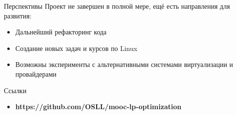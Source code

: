 \documentclass{beamer}
\begin{document}
\begin{frame}{Перспективы}
	Проект не завершен в полной мере, ещё есть направления для развития:
	\begin{itemize}
		\item Дальнейший рефакторинг кода  
		\item Создание новых задач и курсов по Linux
		\item Возможны эксперименты с альтернативными системами виртуализации и провайдерами
	\end{itemize}
\end{frame}

\begin{frame}{Ссылки}
	\begin{itemize}
		\item \textbf{https://github.com/OSLL/mooc-lp-optimization}
	\end{itemize}
\end{frame}
\end{document}
